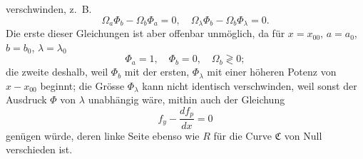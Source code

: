 \documentclass[11pt,a4paper,leqno]{article}
\begin{document}
verschwinden, z.~B.
\begin{equation}\tag{54}
\Omega_a\Phi_b-\Omega_b\Phi_a=0,
\quad
\Omega_\lambda\Phi_b-\Omega_b\Phi_\lambda=0.
\end{equation}
Die erste dieser Gleichungen ist aber offenbar unmöglich, da für $x=x_{00}$, $a=a_0$, $b=b_0$, $\lambda=\lambda_0$
\begin{equation}\tag{55}
\Phi_a=1,
\quad \Phi_b=0,
\quad \Omega_b\gtrless 0;
\end{equation}
die zweite deshalb, weil $\Phi_b$ mit der ersten, $\Phi_\lambda$ mit einer höheren Potenz von $x-x_{00}$ beginnt; die Grösse $\Phi_\lambda$ kann nicht identisch verschwinden, weil sonst der Ausdruck $\Phi$ von $\lambda$ unabhängig wäre, mithin auch der Gleichung
\[
f_y-\frac{df_p}{dx}=0
\]
genügen würde, deren linke Seite ebenso wie $R$ für die Curve $\mathfrak{C}$ von Null verschieden ist.
\end{document}
